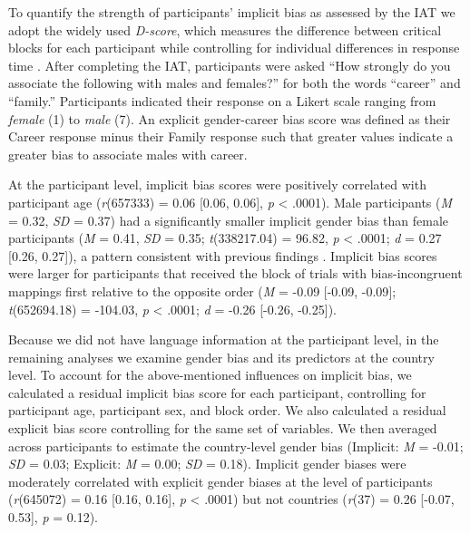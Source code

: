 \documentclass[9pt,twocolumn,twoside,lineno]{pnas-new}
\begin{document}
To quantify the strength of participants’ implicit bias as assessed by the IAT we adopt the widely used  \emph{D-score}, which measures the difference between critical blocks for each participant while controlling for individual differences
in response time \cite{greenwald1998measuring}. After completing
the IAT, participants were asked \enquote{How strongly do you associate
the following with males and females?} for both the words
\enquote{career} and \enquote{family.} Participants indicated their
response on a Likert scale ranging from \emph{female} (1) to \emph{male}
(7). An explicit gender-career bias score was defined as their Career response minus their Family response such that greater values indicate a greater bias to associate males with career.

At the participant level, implicit bias scores were positively correlated with
participant age (\emph{r}(657333) = 0.06 {[}0.06, 0.06{]}, \emph{p} \textless{} .0001). Male participants (\emph{M} = 0.32, \emph{SD} = 0.37) had a significantly smaller implicit gender bias than female participants (\emph{M} = 0.41, \emph{SD} = 0.35; \emph{t}(338217.04) = 96.82, \emph{p} \textless{} .0001; \emph{d} = 0.27 {[}0.26, 0.27{]}), a pattern consistent with previous findings \cite{nosek2002harvesting}. Implicit bias scores were larger for participants that received the block of trials with bias-incongruent mappings first relative to the opposite order (\emph{M} = -0.09 {[}-0.09, -0.09{]}; \emph{t}(652694.18) = -104.03, \emph{p} \textless{} .0001; \emph{d} = -0.26 {[}-0.26, -0.25{]}).

Because we did not have language information at the participant level, in the remaining analyses we examine gender bias and its predictors at the country level. To account for the above-mentioned influences on implicit bias, we calculated a residual implicit bias score for each participant, controlling for participant age, participant sex, and block order. We also calculated a residual explicit bias score controlling for the same set of variables. We then averaged across participants to estimate the country-level gender bias (Implicit: \emph{M} = -0.01; \emph{SD} = 0.03; Explicit: \emph{M} = 0.00; \emph{SD} = 0.18). Implicit gender biases were moderately correlated with explicit gender biases at the level of participants (\emph{r}(645072) = 0.16 {[}0.16, 0.16{]}, \emph{p} \textless{} .0001) but not countries (\emph{r}(37) = 0.26 {[}-0.07, 0.53{]}, \emph{p} = 0.12).
\end{document}
